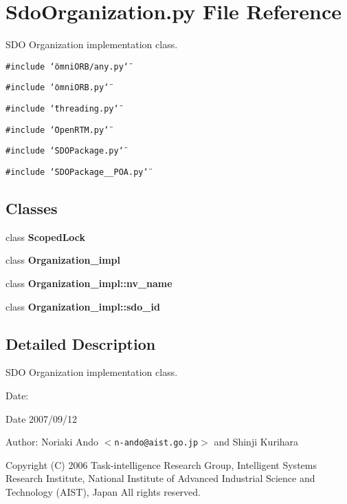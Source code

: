 \section{Sdo\-Organization.py File Reference}
\label{SdoOrganization_8py}
SDO Organization implementation class. 

{\tt \#include \char`\"{}omni\-ORB/any.py\char`\"{}}\par
{\tt \#include \char`\"{}omni\-ORB.py\char`\"{}}\par
{\tt \#include \char`\"{}threading.py\char`\"{}}\par
{\tt \#include \char`\"{}Open\-RTM.py\char`\"{}}\par
{\tt \#include \char`\"{}SDOPackage.py\char`\"{}}\par
{\tt \#include \char`\"{}SDOPackage\_\-\_\-POA.py\char`\"{}}\par
\subsection*{Classes}
\begin{CompactItemize}
\item 
class {\bf Scoped\-Lock}
\item 
class {\bf Organization\_\-impl}
\item 
class {\bf Organization\_\-impl::nv\_\-name}
\item 
class {\bf Organization\_\-impl::sdo\_\-id}
\end{CompactItemize}


\subsection{Detailed Description}
SDO Organization implementation class. 

\begin{Desc}
\item[Date:]\begin{Desc}
\item[Date]2007/09/12 \end{Desc}
\end{Desc}
\begin{Desc}
\item[Author:]Noriaki Ando $<${\tt n-ando@aist.go.jp}$>$ and Shinji Kurihara\end{Desc}
Copyright (C) 2006 Task-intelligence Research Group, Intelligent Systems Research Institute, National Institute of Advanced Industrial Science and Technology (AIST), Japan All rights reserved.